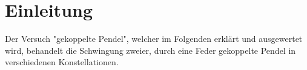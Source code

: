 \section{Einleitung}
\label{sec:Einleitung}
Der Versuch "gekoppelte Pendel", welcher im Folgenden erklärt und ausgewertet wird, behandelt
die Schwingung zweier, durch eine Feder gekoppelte Pendel in verschiedenen Konstellationen.
